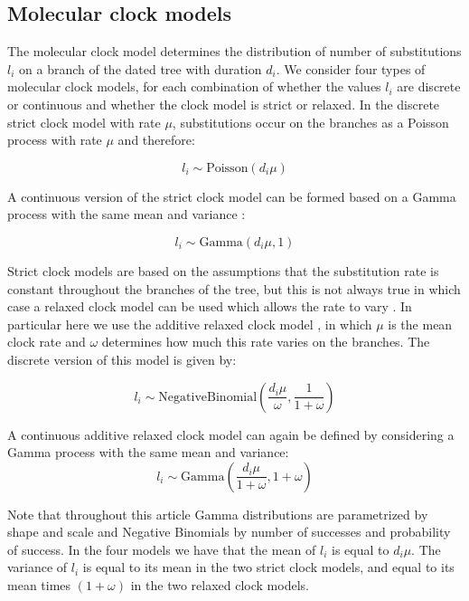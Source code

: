 \documentclass{article}
\begin{document}
\subsection*{Molecular clock models}

The molecular clock model determines the distribution of number of substitutions $l_i$ on a branch of the dated
tree with duration $d_i$. We consider four types of molecular clock models, for each combination of whether
the values $l_i$ are discrete or continuous and whether the clock model is strict or relaxed. 
In the discrete strict clock
model \citep{Zuckerkandl1962} with rate $\mu$,
substitutions occur on the branches as a Poisson process with rate $\mu$ and therefore:

\begin{equation}
l_i \sim \mathrm{Poisson}(d_i \mu)
\label{eq:sc}
\end{equation}

A continuous version of the strict clock model can be formed based on a Gamma process with the same mean and variance \citep{Didelot2021}:

\begin{equation}
l_i \sim \mathrm{Gamma}(d_i \mu,1)
\label{eq:csc}
\end{equation}

Strict clock models are based on the assumptions that the substitution rate is constant throughout the branches
of the tree, but this is not always true in which case a relaxed clock model can be used which allows
the rate to vary \citep{Drummond2006}. In particular here we use the additive relaxed clock model \citep{Didelot2021},
in which $\mu$ is the mean clock rate and $\omega$ determines how much this rate varies on the branches.
The discrete version of this model is given by: 

\begin{equation}
l_i \sim \mathrm{NegativeBinomial}\left(\frac{d_i \mu}{\omega},\frac{1}{1+\omega}\right)
\label{eq:arc}
\end{equation}

A continuous additive relaxed clock model can again be defined by considering a Gamma process with the same mean and variance:
\begin{equation}
l_i \sim \mathrm{Gamma}\left(\frac{d_i \mu}{1+\omega},1+\omega\right)
\label{eq:carc}
\end{equation}

Note that throughout this article Gamma distributions are parametrized by shape and scale and Negative Binomials 
by number of successes and probability of success. In the four models we have that the mean of $l_i$ is equal to
$d_i \mu$. The variance of $l_i$ is equal to its mean in the two strict clock models, and equal to its mean 
times $(1+\omega)$ in the two relaxed clock models.
\end{document}
